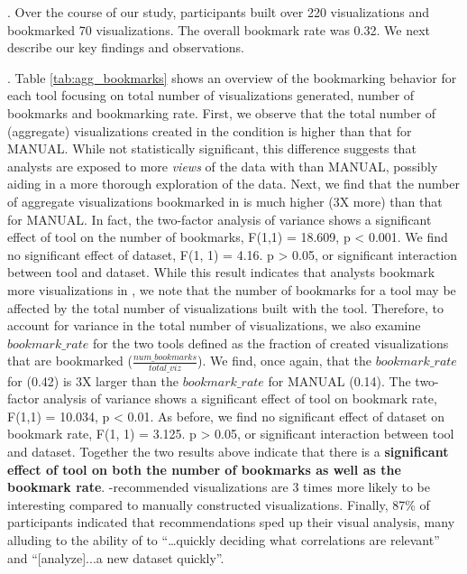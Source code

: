 .
Over the course of our study, participants built over 220 visualizations 
and bookmarked 70 visualizations.
The overall bookmark rate was 0.32.
We next describe our key findings and observations.

.
Table \ref{tab:agg_bookmarks} shows an overview of the bookmarking behavior for each tool
focusing on total number of visualizations generated, number of bookmarks and bookmarking rate.
First, we observe that the total number of (aggregate) visualizations created in the \SeeDB
condition is higher than that for MANUAL. 
While not statistically significant, this difference suggests that analysts are exposed to more
{\em views} of the data with \SeeDB than MANUAL, possibly aiding in a more thorough exploration of
the data.
Next, we find that the number of aggregate visualizations bookmarked in \SeeDB is much higher (3X more)
than that for MANUAL.
In fact, the two-factor analysis of variance shows a significant effect of tool on the number of bookmarks,
F(1,1) = 18.609, p < 0.001. 
We find no significant effect of dataset, F(1, 1) = 4.16. p > 0.05, or
significant interaction between tool and dataset.
While this result indicates that analysts bookmark more visualizations in \SeeDB, we note that the number of 
bookmarks for a tool may be affected by the total number of visualizations built with the tool.
Therefore, to account for variance in the total number of visualizations, we also examine $bookmark\_rate$
for the two tools defined as the fraction of
created visualizations that are bookmarked ($\frac{num\_bookmarks}{total\_viz}$).
We find, once again, that the $bookmark\_rate$ for \SeeDB (0.42) is 3X larger than the $bookmark\_rate$ for 
MANUAL (0.14).
The two-factor analysis of variance shows a significant effect of tool on bookmark rate, F(1,1) = 10.034, p < 0.01.
As before, we find no significant effect of dataset on bookmark rate, F(1, 1) = 3.125. p > 0.05, or
significant interaction between tool and dataset.
Together the two results above indicate that there is a {\bf significant effect of tool on both the number of bookmarks as well as the
bookmark rate}.
\SeeDB-recommended visualizations are 3 times more likely to be interesting compared
to manually constructed visualizations.
Finally, 87\% of participants indicated that \SeeDB recommendations sped up their visual analysis, many alluding
to the ability of \SeeDB to ``\ldots quickly deciding what correlations are relevant'' and 
``[analyze]...a new dataset quickly''.


